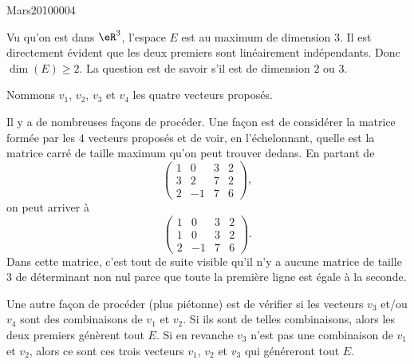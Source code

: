 

\begin{corrige}{Mars20100004}

	Vu qu'on est dans $\eR^3$, l'espace $E$ est au maximum de dimension $3$. Il est directement évident que les deux premiers sont linéairement indépendants. Donc $\dim(E)\geq 2$. La question est de savoir s'il est de dimension $2$ ou $3$.

	Nommons $v_1$, $v_2$, $v_3$ et $v_4$ les quatre vecteurs proposés.

	Il y a de nombreuses façons de procéder. Une façon est de considérer la matrice formée par les $4$ vecteurs proposés et de voir, en l'échelonnant, quelle est la matrice carré de taille maximum qu'on peut trouver dedans. En partant de
	\begin{equation}
		\begin{pmatrix}
			 1	&	0	&	3	&	2	\\
			 3	&	2	&	7	&	2	\\ 
			 2	&	-1	&	7	&	6
		 \end{pmatrix},
	\end{equation}
	on peut arriver à
	\begin{equation}
		\begin{pmatrix}
			 1	&	0	&	3	&	2	\\
			 1	&	0	&	3	&	2	\\ 
			 2	&	-1	&	7	&	6
		 \end{pmatrix}.
	\end{equation}
	Dans cette matrice, c'est tout de suite visible qu'il n'y a aucune matrice de taille $3$ de déterminant non nul parce que toute la première ligne est égale à la seconde.

	Une autre façon de procéder (plus piétonne) est de vérifier si les vecteurs $v_3$ et/ou $v_4$ sont des combinaisons de $v_1$ et $v_2$. Si ils sont de telles combinaisons, alors les deux premiers génèrent tout $E$.  Si en revanche $v_3$ n'est pas une combinaison de $v_1$ et $v_2$, alors ce sont ces trois vecteurs $v_1$, $v_2$ et $v_3$ qui généreront tout $E$.


\end{corrige}
